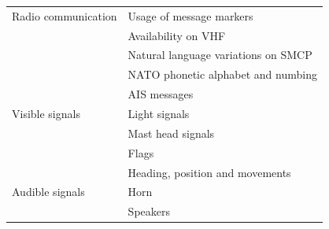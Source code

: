 \begin{table}[H]
	\centering
	\begin{tabular}{l|l}
		\toprule
		Radio communication & Usage of message markers \\
		& Availability on \ac{VHF} \\
		& Natural language variations on \ac{SMCP} \\
		& NATO phonetic alphabet and numbing \\
		& \ac{AIS} messages \\
		\midrule
		Visible signals & Light signals \\
		& Mast head signals \\
		& Flags \\
		& Heading, position and movements \\
		\midrule
		Audible signals & Horn \\
		& Speakers\\
		\bottomrule
	\end{tabular}
	
	\label{tab:current-technology}
\end{table}

